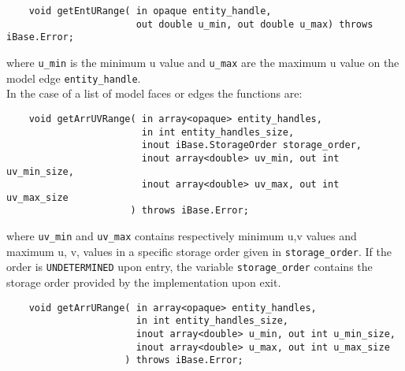 \documentclass{article}
\begin{document}
\begin{verbatim}
    void getEntURange( in opaque entity_handle, 
                       out double u_min, out double u_max) throws iBase.Error;
\end{verbatim}
where {\tt u\_min} is the minimum u value and {\tt u\_max} are 
the maximum u value on the model edge {\tt entity\_handle}.\\

\hspace{-16pt}In the case of a list of model faces or edges the functions 
are:

\begin{verbatim}
    void getArrUVRange( in array<opaque> entity_handles, 
                        in int entity_handles_size,
                        inout iBase.StorageOrder storage_order,
                        inout array<double> uv_min, out int uv_min_size,
                        inout array<double> uv_max, out int uv_max_size
                      ) throws iBase.Error;
\end{verbatim}
where {\tt uv\_min} and {\tt uv\_max} contains respectively minimum u,v values and maximum u,
v, values in a specific storage order given in {\tt storage\_order}. If
the order is {\tt UNDETERMINED} upon entry, the variable
{\tt storage\_order} contains the storage order provided by the implementation upon
exit.

\begin{verbatim}
    void getArrURange( in array<opaque> entity_handles, 
                       in int entity_handles_size,
                       inout array<double> u_min, out int u_min_size,
                       inout array<double> u_max, out int u_max_size
                     ) throws iBase.Error;
\end{verbatim}

\end{document}
